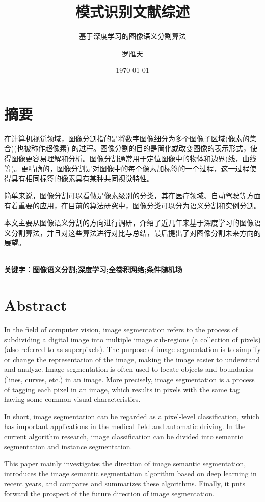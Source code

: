 \documentclass[cn]{elegantbook}
\title{模式识别文献综述}
\subtitle{基于深度学习的图像语义分割算法}
\author{罗雁天}
\institute{清华大学电子系}
\date{\today}
\begin{document}
\maketitle
\tableofcontents
\mainmatter
\hypersetup{pageanchor=true}
\chapter*{摘要}
在计算机视觉领域，图像分割指的是将数字图像细分为多个图像子区域(像素的集合)(也被称作超像素) 的过程。图像分割的目的是简化或改变图像的表示形式，使得图像更容易理解和分析。图像分割通常用于定位图像中的物体和边界(线，曲线等)。更精确的，图像分割是对图像中的每个像素加标签的一个过程，这一过程使得具有相同标签的像素具有某种共同视觉特性。

简单来说，图像分割可以看做是像素级别的分类，其在医疗领域、自动驾驶等方面有着重要的应用，在目前的算法研究中，图像分类可以分为语义分割和实例分割。

本文主要从图像语义分割的方向进行调研，介绍了近几年来基于深度学习的图像语义分割算法，并且对这些算法进行对比与总结，最后提出了对图像分割未来方向的展望。

~\\

\noindent\textbf{关键字：图像语义分割;深度学习;全卷积网络;条件随机场}

\chapter*{Abstract}
In the field of computer vision, image segmentation refers to the process of subdividing a digital image into multiple image sub-regions (a collection of pixels) (also referred to as superpixels). The purpose of image segmentation is to simplify or change the representation of the image, making the image easier to understand and analyze. Image segmentation is often used to locate objects and boundaries (lines, curves, etc.) in an image. More precisely, image segmentation is a process of tagging each pixel in an image, which results in pixels with the same tag having some common visual characteristics.

In short, image segmentation can be regarded as a pixel-level classification, which has important applications in the medical field and automatic driving. In the current algorithm research, image classification can be divided into semantic segmentation and instance segmentation.

This paper mainly investigates the direction of image semantic segmentation, introduces the image semantic segmentation algorithm based on deep learning in recent years, and compares and summarizes these algorithms. Finally, it puts forward the prospect of the future direction of image segmentation.
\end{document}
